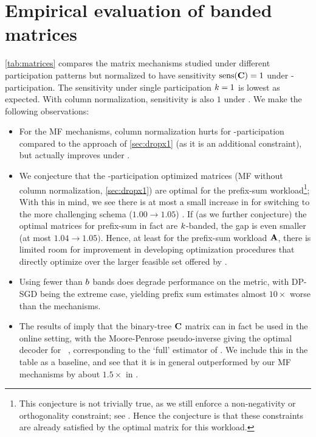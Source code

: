 \documentclass{article}
\begin{document}
\section{Empirical evaluation of banded matrices}\label{sec:matrixtable}

\cref{tab:matrices} compares the matrix mechanisms studied under different participation patterns but normalized to have sensitivity $\operatorname{sens}(\mathbf{C})=1$ under -participation. The sensitivity under single participation $k=1$ is lowest as expected. With column normalization, sensitivity is also $1$ under . We make the following observations:
\begin{itemize}
    \item For the MF mechanisms, column normalization hurts \rmse for \multiepoch-participation compared to the approach of \cref{sec:dropx1} (as it is an additional constraint), but actually improves \rmse under \bparticipation.  
    
    \item We conjecture that the \multiepoch-participation optimized matrices (MF without column normalization, \cref{sec:dropx1}) are optimal for the prefix-sum workload\footnote{This conjecture is not trivially true, as we still enforce a non-negativity or orthogonality constraint; see \citet[Appendix I.3]{choquette2022multi}. Hence the conjecture is that these constraints are already satisfied by the optimal matrix for this workload.}; With this in mind, we see there is at most a small increase in \rmse for switching to the more challenging \bparticipation schema ($1.00 \rightarrow 1.05$) . If (as we further conjecture) the optimal matrices for prefix-sum in fact are $k$-banded, the gap is even smaller (at most $1.04 \rightarrow 1.05)$. Hence, at least for the prefix-sum workload $\mathbf{A}$,  there is limited room for improvement in developing optimization procedures that directly optimize over the larger feasible set offered by \bparticipation.
    
    \item Using fewer than $b$ bands does degrade performance on the \rmse metric, with DP-SGD being the extreme case, yielding prefix sum estimates almost $10\times$ worse than the \MF mechanisms.
    
    \item The results of \citet{denisov22matfact} imply that the binary-tree $\mathbf{C}$ matrix can in fact be used in the online setting, with the Moore-Penrose pseudo-inverse giving the optimal decoder for \rmse~\cite{choquette2022multi}, corresponding to the `full' estimator of \citet{honaker2015efficient}. We include this in the table as a baseline, and see that it is in general outperformed by our MF mechanisms by about $1.5\times$ in \rmse.  
\end{itemize}
\end{document}
